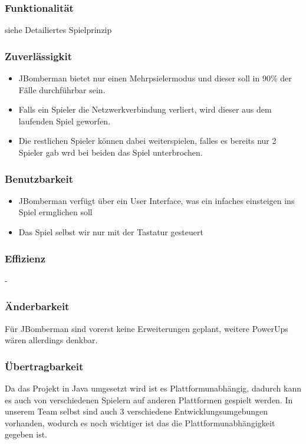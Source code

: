 \documentclass[11pt]{scrartcl}
\begin{document}
\subsubsection{Funktionalität}
\label{sec:Funktionalität}
siehe Detailiertes Spielprinzip


\subsubsection{Zuverlässigkit}
\label{sec:Zuverlässigkeit}
\begin{itemize}
    \item JBomberman bietet nur einen Mehrpsielermodus und dieser soll in 90\% der Fälle durchführbar sein.
    \item Falls ein Spieler die Netzwerkverbindung verliert, wird dieser aus dem laufenden Spiel geworfen.
    \item Die restlichen Spieler können dabei weiterspielen, falles es bereits nur 2 Spieler gab wrd bei beiden das Spiel unterbrochen.
\end{itemize}

\subsubsection{Benutzbarkeit}
\label{sec:Benutzbarkeit}
\begin{itemize}
    \item JBomberman verfügt über ein User Interface, was ein infaches einsteigen ins Spiel ermglichen soll
    \item Das Spiel selbst wir nur mit der Tastatur gesteuert
\end{itemize}

\subsubsection{Effizienz}
\label{sec:Effizienz}
-
\subsubsection{Änderbarkeit}
\label{sec:Änderbarkeit}
Für JBomberman sind vorerst keine Erweiterungen geplant, weitere PowerUps wären allerdings denkbar.


\subsubsection{Übertragbarkeit}
\label{sec:Übertragbarkeit}
Da das Projekt in Java umgesetzt wird ist es Plattformunabhängig, dadurch kann es auch von verschiedenen Spielern auf anderen Plattformen gespielt werden.
In unserem Team selbst sind auch 3 verschiedene Entwicklungsumgebungen vorhanden, wodurch es noch wichtiger ist das die Plattformunabhängigkeit gegeben ist.
\end{document}
